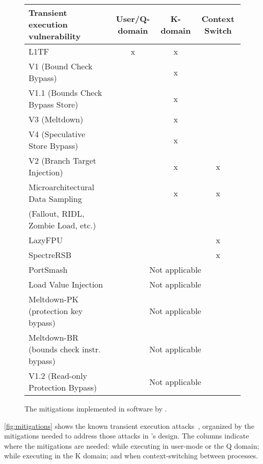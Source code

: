 \begin{figure}
\centering
\small
\begin{tabular}{lccc}
{\bf Transient execution vulnerability} & {\bf User/Q-domain} & {\bf K-domain} & {\bf Context Switch} \\

\midrule
L1TF & x & x & \\

\midrule
V1 (Bound Check Bypass) & & x & \\
V1.1 (Bounds Check Bypass Store) & & x &\\
V3 (Meltdown) && x &\\
V4 (Speculative Store Bypass) &	 & x &  \\

\midrule
V2 (Branch Target Injection) & & x & x \\
Microarchitectural Data Sampling && x & x\\
\qquad (Fallout, RIDL, Zombie Load, etc.) \\

\midrule

LazyFPU &&& x \\
SpectreRSB &&& x\\

\midrule
PortSmash & \multicolumn{3}{c}{Not applicable} \\
Load Value Injection & \multicolumn{3}{c}{Not applicable} \\
Meltdown-PK (protection key bypass) & \multicolumn{3}{c}{Not applicable} \\
Meltdown-BR (bounds check instr. bypass) & \multicolumn{3}{c}{Not applicable} \\
V1.2 (Read-only Protection Bypass) & \multicolumn{3}{c}{Not applicable} \\

\end{tabular}
\caption{The mitigations implemented in software by \sys{}.}
\label{fig:mitigations}
\end{figure}

\autoref{fig:mitigations} shows the known transient execution
attacks~\cite{hill:survey,sok:transient}, organized by the mitigations
needed to address those attacks in \sys's design.  The columns indicate where the mitigations are needed: while
executing in user-mode or the Q domain; while executing in the K domain;
and when context-switching between processes.


